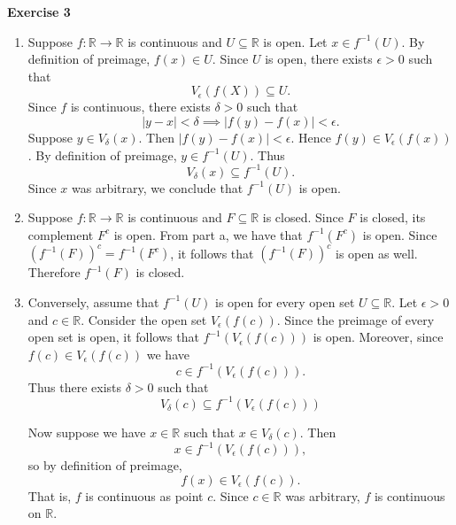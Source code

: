 \documentclass[12pt]{article}
\begin{document}
\textbf{Exercise 3}
\begin{enumerate}[label=(\alph*)]
    \item Suppose \(f:\mathbb R\to\mathbb R\) is continuous and \(U\subseteq\mathbb R\) is open. Let \(x \in f^{-1}(U)\). By definition of preimage, \(f(x) \in U\). Since \(U\) is open, there exists \(\epsilon > 0\) such that
          \[
              V_{\epsilon}(f(X)) \subseteq U.
          \]
          Since \(f\) is continuous, there exists \(\delta > 0\) such that
          \[
              | y -x | < \delta \implies | f(y) - f(x) | < \epsilon.
          \]
          Suppose \(y \in V_{\delta}(x)\). Then \(| f(y) - f(x) | < \epsilon\). Hence \(f(y) \in V_{\epsilon}(f(x))\). By definition of preimage, \(y \in f^{-1}(U)\). Thus
          \[
              V_{\delta}(x) \subseteq f^{-1}(U).
          \]
          Since \(x\) was arbitrary, we conclude that \(f^{-1}(U)\) is open.

    \item  Suppose \(f:\mathbb R\to\mathbb R\) is continuous and \(F\subseteq\mathbb R\) is closed. Since \(F\) is closed, its complement \( F^c\) is open. From part a, we have that \(f^{-1}(F^c)\) is open. Since \((f^{-1}(F))^c = f^{-1}(F^c)\), it follows that \( (f^{-1}(F))^c\) is open as well. Therefore \(f^{-1}(F)\) is closed.

    \item  Conversely, assume that \(f^{-1}(U)\) is open for every open set \(U \subseteq \mathbb{R}\). Let \(\epsilon > 0\) and \(c \in \mathbb{R}\). Consider the open set \(V_{\epsilon}(f(c))\). Since the preimage of every open set is open, it follows that \(f^{-1}(V_{\epsilon}(f(c)))\) is open. Moreover, since \(f(c) \in V_{\epsilon}(f(c))\) we have
          \[
              c \in f^{-1}(V_{\epsilon}(f(c))).
          \]
          Thus there exists \(\delta > 0\) such that
          \[
              V_{\delta}(c) \subseteq  f^{-1}(V_{\epsilon}(f(c)))
          \]

          Now suppose we have \(x \in \mathbb{R}\) such that \(x \in V_{\delta}(c)\).
          Then
          \[
              x \in f^{-1}(V_{\epsilon}(f(c))),
          \]
          so by definition of preimage,
          \[
              f(x) \in V_{\epsilon}(f(c)).
          \]
          That is, \(f\) is continuous as point \(c\).
          Since \( c \in \mathbb{R} \) was arbitrary, \(f\) is continuous on \(\mathbb{R}\).
\end{enumerate}
\end{document}
